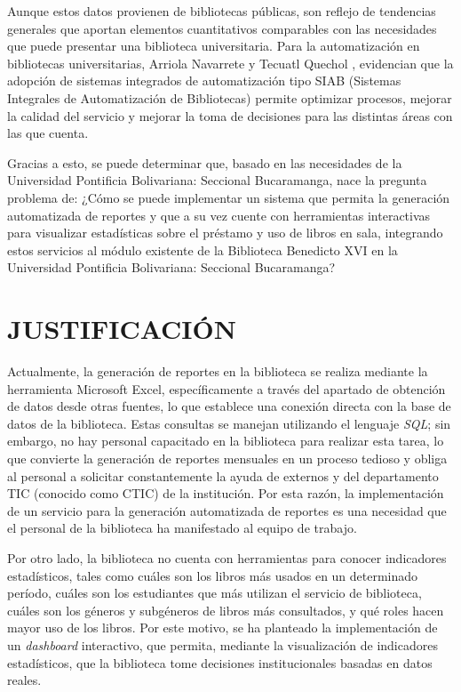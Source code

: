 \documentclass[spanish]{ieee_upb}
\begin{document}
Aunque estos datos provienen de bibliotecas públicas, son reflejo de tendencias generales que aportan elementos cuantitativos comparables con las necesidades que puede presentar una biblioteca universitaria. Para la automatización en bibliotecas universitarias, Arriola Navarrete y Tecuatl Quechol \cite{Arriola2011}, evidencian que la adopción de sistemas integrados de automatización tipo SIAB (Sistemas Integrales de Automatización de Bibliotecas) permite optimizar procesos, mejorar la calidad del servicio y mejorar la toma de decisiones para las distintas áreas con las que cuenta.


Gracias a esto, se puede determinar que, basado en las necesidades de la Universidad Pontificia Bolivariana: Seccional Bucaramanga, nace la pregunta problema de: ¿Cómo se puede implementar un sistema que permita la generación automatizada de reportes y que a su vez cuente con herramientas interactivas para visualizar estadísticas sobre el préstamo y uso de libros en sala, integrando estos servicios al módulo existente de la Biblioteca Benedicto XVI en la Universidad Pontificia Bolivariana: Seccional Bucaramanga?

\newpage
\section{JUSTIFICACIÓN}
Actualmente, la generación de reportes en la biblioteca se realiza mediante la herramienta Microsoft Excel, específicamente a través del apartado de obtención de datos desde otras fuentes, lo que establece una conexión directa con la base de datos de la biblioteca. Estas consultas se manejan utilizando el lenguaje \textit{SQL}; sin embargo, no hay personal capacitado en la biblioteca para realizar esta tarea, lo que convierte la generación de reportes mensuales en un proceso tedioso y obliga al personal a solicitar constantemente la ayuda de externos y del departamento TIC (conocido como CTIC) de la institución. Por esta razón, la implementación de un servicio para la generación automatizada de reportes es una necesidad que el personal de la biblioteca ha manifestado al equipo de trabajo.

Por otro lado, la biblioteca no cuenta con herramientas para conocer indicadores estadísticos, tales como cuáles son los libros más usados en un determinado período, cuáles son los estudiantes que más utilizan el servicio de biblioteca, cuáles son los géneros y subgéneros de libros más consultados, y qué roles hacen mayor uso de los libros. Por este motivo, se ha planteado la implementación de un \textit{dashboard} interactivo, que permita, mediante la visualización de indicadores estadísticos, que la biblioteca tome decisiones institucionales basadas en datos reales.
\end{document}
